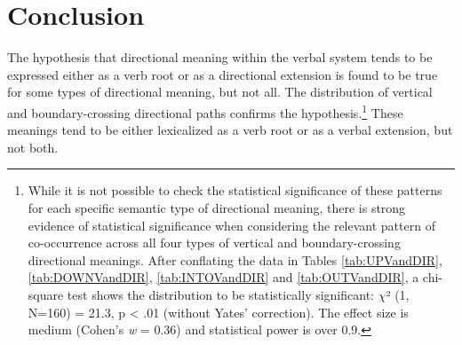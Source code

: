 \section{Conclusion} \label{sec:verbsummary}

The hypothesis that directional meaning within the verbal system tends to be expressed either as a verb root or as a directional extension is found to be true for some types of directional meaning, but not all. The distribution of vertical and boundary-crossing directional paths confirms the hypothesis.\footnote{While it is not possible to check the statistical significance of these patterns for each specific semantic type of directional meaning, there is strong evidence of statistical significance when considering the relevant pattern of co-occurrence across all four types of vertical and boundary-crossing directional meanings. After conflating the data in Tables \ref{tab:UPVandDIR}, \ref{tab:DOWNVandDIR}, \ref{tab:INTOVandDIR} and \ref{tab:OUTVandDIR}, a chi-square test shows the distribution to be statistically significant: $\chi$² (1, N=160) = 21.3, p < .01 (without Yates' correction). The effect size is medium (Cohen's \textit{w} = 0.36) and statistical power is over 0.9.} These meanings tend to be either lexicalized as a verb root or as a verbal extension, but not both. 

